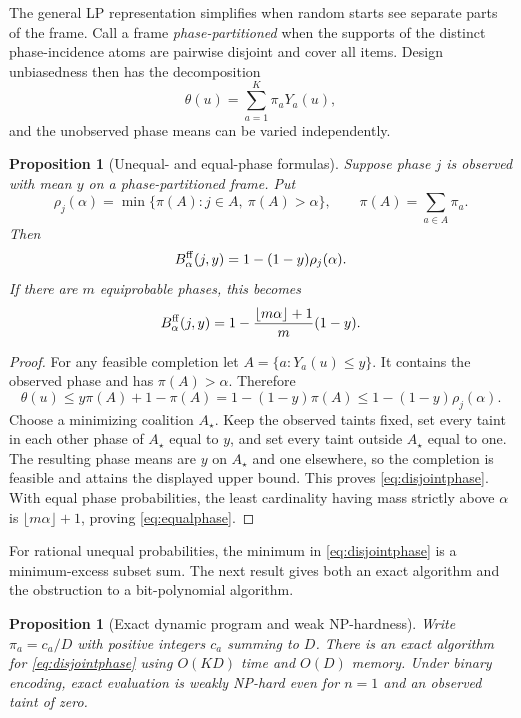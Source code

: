 \documentclass[11pt]{article}
\newtheorem{proposition}[theorem]{Proposition}
\theoremstyle{definition}
\begin{document}
The general LP representation simplifies when random starts see separate
parts of the frame. Call a frame \emph{phase-partitioned} when the supports of
the distinct phase-incidence atoms are pairwise disjoint and cover all items.
Design unbiasedness then has the decomposition
\[
 \theta(u)=\sum_{a=1}^K\pi_aY_a(u),
\]
and the unobserved phase means can be varied independently.

\begin{proposition}[Unequal- and equal-phase formulas]
\label{prop:disjointphase}
Suppose phase $j$ is observed with mean $y$ on a phase-partitioned frame. Put
\[
 \rho_j(\alpha)
 =\min\{\pi(A):j\in A,\ \pi(A)>\alpha\},
 \qquad \pi(A)=\sum_{a\in A}\pi_a.
\]
Then
\begin{equation}\label{eq:disjointphase}
 B^{\rm ff}_\alpha(j,y)=1-(1-y)\rho_j(\alpha).
\end{equation}
If there are $m$ equiprobable phases, this becomes
\begin{equation}\label{eq:equalphase}
 B^{\rm ff}_\alpha(j,y)
 =1-\frac{\lfloor m\alpha\rfloor+1}{m}(1-y).
\end{equation}
\end{proposition}

\begin{proof}
For any feasible completion let $A=\{a:Y_a(u)\le y\}$. It contains the
observed phase and has $\pi(A)>\alpha$. Therefore
\[
 \theta(u)
 \le y\pi(A)+1-\pi(A)
 =1-(1-y)\pi(A)
 \le1-(1-y)\rho_j(\alpha).
\]
Choose a minimizing coalition $A_\star$. Keep the observed taints fixed, set
every taint in each other phase of $A_\star$ equal to $y$, and set every
taint outside $A_\star$ equal to one. The resulting phase means are $y$ on
$A_\star$ and one elsewhere, so the completion is feasible and attains the
displayed upper bound. This proves \eqref{eq:disjointphase}. With equal
phase probabilities, the least cardinality having mass strictly above
$\alpha$ is $\lfloor m\alpha\rfloor+1$, proving \eqref{eq:equalphase}.
\end{proof}

For rational unequal probabilities, the minimum in
\eqref{eq:disjointphase} is a minimum-excess subset sum. The next result gives
both an exact algorithm and the obstruction to a bit-polynomial algorithm.

\begin{proposition}[Exact dynamic program and weak NP-hardness]
\label{prop:disjointdp}
Write $\pi_a=c_a/D$ with positive integers $c_a$ summing to $D$. There is an
exact algorithm for \eqref{eq:disjointphase} using $O(KD)$ time and $O(D)$
memory. Under binary encoding, exact evaluation is weakly NP-hard even for
$n=1$ and an observed taint of zero.
\end{proposition}
\end{document}
